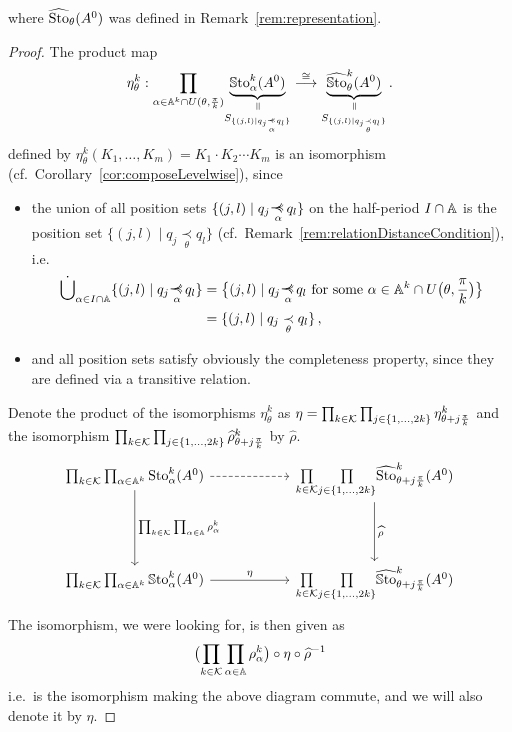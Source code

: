 where $\widehat{\operatorname{Sto}}_{\theta}(A^0)$ was defined in Remark~\ref{rem:representation}.
\begin{proof}
  The product map
  \[
    \eta_\theta^k:
    \underset{\alpha\in\A^k\cap U(\theta,\frac{\pi}{k})}\prod
    \underset{S_{\{(j,l)\mid q_j\myrel{\alpha}q_l\}}}{%
      \underset{\text{\rotatebox[origin=c]{-90}{$=$}}}{\underbrace{%
          \SSto_\alpha^k(A^0)}}}
    \overset{\cong}{\longrightarrow}
    \underset{S_{\{(j,l) \mid q_j \underset{\theta}{\prec} q_l \}}}{%
      \underset{\text{\rotatebox[origin=c]{-90}{$=$}}}{\underbrace{%
          \hat\SSto_\theta^k(A^0)}}}
    \,.
  \]
  defined by $\eta_\theta^k(K_1,\dots,K_m) = K_1\cdot K_2\cdots K_m$ is an
  isomorphism (cf.\ Corollary~\ref{cor:composeLevelwise}), since
  \begin{itemize}
  \item the union of all position sets $\{(j,l)\mid q_j\myrel{\alpha}q_l\}$ on
    the half-period $I\cap\mathbb{A}$ is the position set
    $\{(j,l) \mid q_j \underset{\theta}{\prec} q_l \}$
    (cf.\ Remark~\ref{rem:relationDistanceCondition}), i.e.\
  \begin{align*}
    \dot\bigcup_{\alpha\in I\cap\A}
    \{(j,l)\mid q_j\myrel{\alpha}q_l\}
    &=\bigl\{(j,l) \mid q_j \myrel{\alpha} q_l
        \text{~for some~}\alpha\in\A^k\cap U\bigl(\theta,\frac{\pi}{k}\bigr)
      \bigr\}
    \\&= \{(j,l) \mid q_j \underset{\theta}{\prec} q_l \} \,,
  \end{align*}
  \item and all position sets satisfy obviously the completeness property, since
    they are defined via a transitive relation.
  \end{itemize}


  Denote the product of the isomorphisms $\eta_\theta^k$ as $\eta=
  \prod_{k\in\mathcal{K}}\prod_{j\in\{1,\dots,2k\}}
  \eta_{\theta+j\frac{\pi}{k}}^k$ and the isomorphism
  $\prod_{k\in\mathcal{K}}\prod_{j\in\{1,\dots,2k\}}\widehat\rho_{\theta+j\frac{\pi}{k}}^k$ by
  $\hat\rho$.
  \[ \begin{tikzcd}[column sep=2cm,row sep=1.5cm]
    \prod_{k\in\cK}\prod_{\alpha\in\A^k}\Sto_\alpha^k(A^0)
    \rar[dashed]
    \dar{\prod_{k\in\cK}\prod_{\alpha\in\A}\rho_{\alpha}^k}&
    \underset{k\in\cK}{\prod}\underset{j\in\{1,\dots,2k\}}{\prod}
    \hat\Sto_{\theta+j\frac{\pi}{k}}^k(A^0)
    \dar{\hat\rho}
    \\
    \prod_{k\in\cK}\prod_{\alpha\in\A^k}\SSto_\alpha^k(A^0)
    \rar{\eta}
    &
    \underset{k\in\cK}{\prod}\underset{j\in\{1,\dots,2k\}}{\prod}
    \hat\SSto_{\theta+j\frac{\pi}{k}}^k(A^0)
  \end{tikzcd} \]
  The isomorphism, we were looking for, is then given as
  \[
    \bigl(\prod_{k\in\mathcal{K}}\prod_{\alpha\in\mathbb{A}}\rho_{\alpha}^k\bigr)
    \circ \eta \circ
    \widehat\rho^{-1}
  \]
  i.e.\ is the isomorphism making the above diagram commute, and we will also
  denote it by $\eta$.
\end{proof}
